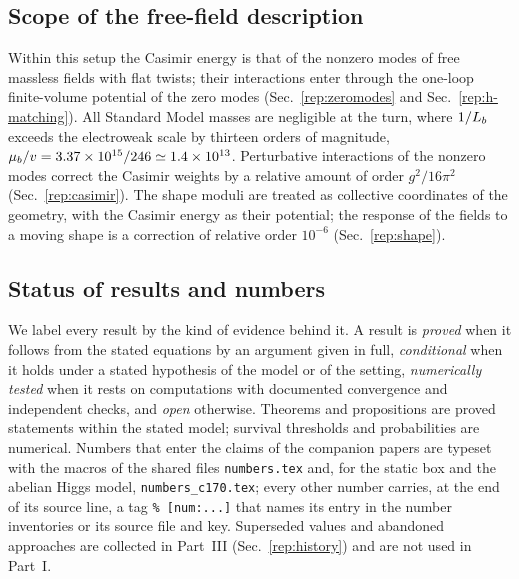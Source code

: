 \subsection{Scope of the free-field description}
\label{rA:scope}

Within this setup the Casimir energy is that of the nonzero modes of free massless fields with flat twists; their interactions enter through the one-loop finite-volume potential of the zero modes (Sec.~\ref{rep:zeromodes} and Sec.~\ref{rep:h-matching}).
All Standard Model masses are negligible at the turn, where $1/L_b$ exceeds the electroweak scale by thirteen orders of magnitude, $\mu_b/v=3.37\times10^{15}/246\simeq1.4\times10^{13}$. %
Perturbative interactions of the nonzero modes correct the Casimir weights by a relative amount of order $g^2/16\pi^2$ (Sec.~\ref{rep:casimir}).
The shape moduli are treated as collective coordinates of the geometry, with the Casimir energy as their potential; the response of the fields to a moving shape is a correction of relative order $10^{-6}$ (Sec.~\ref{rep:shape}).

\subsection{Status of results and numbers}
\label{rA:status}

We label every result by the kind of evidence behind it.
A result is \emph{proved} when it follows from the stated equations by an argument given in full, \emph{conditional} when it holds under a stated hypothesis of the model or of the setting, \emph{numerically tested} when it rests on computations with documented convergence and independent checks, and \emph{open} otherwise.
Theorems and propositions are proved statements within the stated model; survival thresholds and probabilities are numerical.
Numbers that enter the claims of the companion papers are typeset with the macros of the shared files \texttt{numbers.tex} and, for the static box and the abelian Higgs model, \texttt{numbers\_c170.tex}; every other number carries, at the end of its source line, a tag \texttt{\%~[num:...]} that names its entry in the number inventories or its source file and key.
Superseded values and abandoned approaches are collected in Part~III (Sec.~\ref{rep:history}) and are not used in Part~I.
